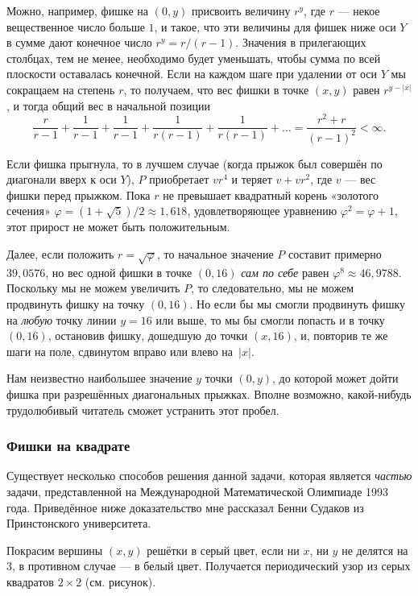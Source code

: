 Можно, например, фишке на $(0, y)$ присвоить величину $r^y$, где $r$ --- некое вещественное число больше $1$, и такое, что эти величины для фишек ниже оси $Y$ в сумме дают конечное число $r^y = r / (r-1)$.
Значения в прилегающих столбцах, тем не менее, необходимо будет уменьшать, чтобы сумма по всей плоскости оставалась конечной.
Если на каждом шаге при удалении от оси $Y$ мы сокращаем на степень $r$, то получаем, что вес фишки в точке $(x, y)$ равен $r^{y - |x|}$, и тогда общий вес в начальной позиции 
\[\frac r{r-1} + \frac 1{r-1} +\frac 1{r-1} +\frac 1{r(r-1)} +\frac 1{r(r-1)} + \dots =\frac{r^2+r}{(r-1)^2} <\infty .\]

Если фишка прыгнула, то в лучшем случае (когда прыжок был совершён по диагонали вверх к оси $Y$), $P$ приобретает $vr^4$ и теряет $v+vr^2$, где $v$ --- вес фишки перед прыжком.
Пока $r$ не превышает квадратный корень «золотого сечения» $\varphi=(1+\sqrt5)/2\approx 1{,}618$, удовлетворяющее уравнению $\varphi^2=\varphi+1$, этот прирост не может быть положительным.

Далее, если положить $r = \sqrt{\varphi}$, то начальное значение $P$ составит примерно $39{,}0576$, но вес одной фишки в точке $(0, 16)$ \emph{сам по себе} равен $\varphi^8\approx 46{,}9788$.
Поскольку мы не можем увеличить $P$, то следовательно, мы не можем продвинуть фишку на точку $(0, 16)$.
Но если бы мы смогли продвинуть фишку на \emph{любую} точку линии $y = 16$ или выше, то мы бы смогли попасть и в точку $(0, 16)$, остановив фишку, дошедшую до точки $(x, 16)$, и, повторив те же шаги на поле, сдвинутом вправо или влево на~$|x|$.
\heart

Нам неизвестно наибольшее значение $y$ точки $(0, y)$, до которой может дойти фишка при разрешённых диагональных прыжках.
Вполне возможно, какой-нибудь трудолюбивый читатель сможет устранить этот пробел.

\subsubsection*{Фишки на квадрате}%

Существует несколько способов решения данной задачи, которая является \emph{частью} задачи, представленной на Международной Математической Олимпиаде 1993 года.
Приведённое ниже доказательство мне рассказал Бенни Судаков из Принстонского университета.

\medskip

Покрасим вершины $(x, y)$ решётки в серый цвет, если ни $x$, ни $y$ не делятся на $3$, в противном случае --- в белый цвет.
Получается периодический узор из серых квадратов $2\times 2$ (см. рисунок). 

